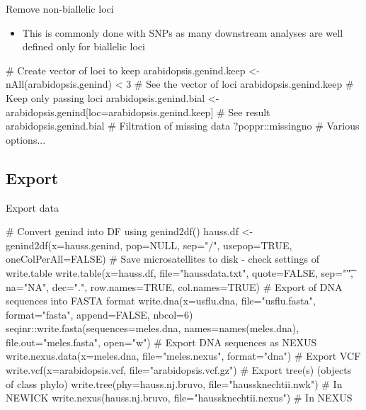 \documentclass[compress, ucs, xelatex, 11pt, xcolor=svgnames,
  hyperref={
    bookmarks=true,
    unicode=true,
    colorlinks=true,
    pdftitle={Molecular data in R},
    plainpages=false,
    pdfauthor={Vojtech Zeisek},
    pdfsubject={Course about phylogeny and evolution in R},
    pdfcreator={XeLaTeX},
    pdfkeywords={R, evolution, phylogeny, molecular data},
    linkcolor=Tomato,
    anchorcolor=SaddleBrown,
    citecolor=Goldenrod,
    filecolor=DarkMagenta,
    menucolor=Sienna,
    urlcolor=DarkTurquoise,
    pdftex},
  url={hyphens, lowtilde} %
  ]{beamer}
\begin{document}
\begin{frame}[fragile]{Remove non-biallelic loci}
  \begin{itemize}
    \item This is commonly done with SNPs as many downstream analyses are well defined only for biallelic loci
  \end{itemize}
  \begin{spluscode}
    # Create vector of loci to keep
    arabidopsis.genind.keep <- nAll(arabidopsis.genind) < 3
    # See the vector of loci
    arabidopsis.genind.keep
    # Keep only passing loci
    arabidopsis.genind.bial <-
      arabidopsis.genind[loc=arabidopsis.genind.keep]
    # See result
    arabidopsis.genind.bial
    # Filtration of missing data
    ?poppr::missingno # Various options...
  \end{spluscode}
\end{frame}

\subsection{Export}

\begin{frame}[fragile]{Export data}
  \begin{spluscode}
    # Convert genind into DF using genind2df()
    hauss.df <- genind2df(x=hauss.genind, pop=NULL, sep="/",
      usepop=TRUE, oneColPerAll=FALSE)
    # Save microsatellites to disk - check settings of write.table
    write.table(x=hauss.df, file="haussdata.txt", quote=FALSE,
      sep="\t", na="NA", dec=".", row.names=TRUE, col.names=TRUE)
    # Export of DNA sequences into FASTA format
    write.dna(x=usflu.dna, file="usflu.fasta", format="fasta",
      append=FALSE, nbcol=6)
    seqinr::write.fasta(sequences=meles.dna, names=names(meles.dna),
      file.out="meles.fasta", open="w")
    # Export DNA sequences as NEXUS
    write.nexus.data(x=meles.dna, file="meles.nexus", format="dna")
    # Export VCF
    write.vcf(x=arabidopsis.vcf, file="arabidopsis.vcf.gz")
    # Export tree(s) (objects of class phylo)
    write.tree(phy=hauss.nj.bruvo, file="haussknechtii.nwk") # In NEWICK
    write.nexus(hauss.nj.bruvo, file="haussknechtii.nexus") # In NEXUS
  \end{spluscode}
\end{frame}

\subsection{}
\end{document}
